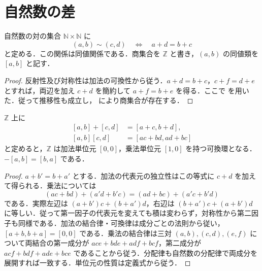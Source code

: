 \section{自然数の差}
\begin{defn}[整数環]
自然数の対の集合 $\mathbb N\times\mathbb N$ に
\[
(a,b)\sim(c,d)\quad\Longleftrightarrow\quad a+d=b+c
\]
と定める．この関係は同値関係である．商集合を $\mathbb Z$ と書き，$(a,b)$ の同値類を $[a,b]$ と記す．
\end{defn}
\begin{proof}
反射性及び対称性は加法の可換性から従う．$a+d=b+c$，$c+f=d+e$ とすれば，両辺を加え $c+d$ を簡約して $a+f=b+e$ を得る．ここで  を用いた．従って推移性も成立し， により商集合が存在する．
\end{proof}
\begin{prop}[整数の加法と乗法]
$\mathbb Z$ 上に
\[
\begin{aligned}
[a,b]+[c,d]&=[a+c,b+d],\\
[a,b][c,d]&=[ac+bd,ad+bc]
\end{aligned}
\]
と定めると，$\mathbb Z$ は加法単位元 $[0,0]$，乗法単位元 $[1,0]$ を持つ可換環となる．$-[a,b]=[b,a]$ である．
\end{prop}
\begin{proof}
$a+b'=b+a'$ とする．加法の代表元の独立性はこの等式に $c+d$ を加えて得られる．乗法については
\[
(ac+bd)+(a'd+b'c)=(ad+bc)+(a'c+b'd)
\]
である．実際左辺は $(a+b')c+(b+a')d$，右辺は $(b+a')c+(a+b')d$ に等しい．従って第一因子の代表元を変えても積は変わらず，対称性から第二因子も同様である．加法の結合律・可換律は成分ごとの法則から従い，$[a+b,b+a]=[0,0]$ である．乗法の結合律は三対 $(a,b),(c,d),(e,f)$ について両結合の第一成分が $ace+bde+adf+bcf$，第二成分が $acf+bdf+ade+bce$ であることから従う．分配律も自然数の分配律で両成分を展開すれば一致する．単位元の性質は定義式から従う．
\end{proof}

